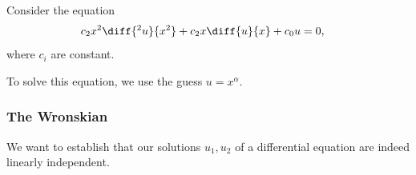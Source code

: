 \documentclass[10pt]{mypackage}
\begin{document}
  \begin{example}
    Consider the equation
    \begin{align*}
      c_2x^2 \diff{^2u}{x^2} + c_2x\diff{u}{x} + c_0 u &= 0,
    \end{align*}
    where $c_i$ are constant.\newline

    To solve this equation, we use the guess $u = x^{\alpha}$.
  \end{example}
  \subsubsection{The Wronskian}%
  We want to establish that our solutions $u_1,u_2$ of a differential equation are indeed linearly independent.\newline
\end{document}
